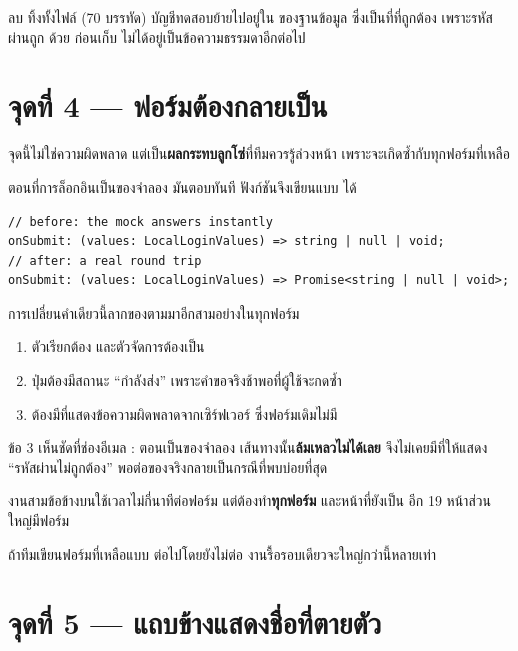  ลบ  ทิ้งทั้งไฟล์ (70 บรรทัด) บัญชีทดสอบย้ายไปอยู่ใน
 ของฐานข้อมูล ซึ่งเป็นที่ที่ถูกต้อง เพราะรหัสผ่านถูก 
ด้วย  ก่อนเก็บ ไม่ได้อยู่เป็นข้อความธรรมดาอีกต่อไป

\section{จุดที่ 4 --- ฟอร์มต้องกลายเป็น }

จุดนี้ไม่ใช่ความผิดพลาด แต่เป็น\textbf{ผลกระทบลูกโซ่}ที่ทีมควรรู้ล่วงหน้า
เพราะจะเกิดซ้ำกับทุกฟอร์มที่เหลือ

ตอนที่การล็อกอินเป็นของจำลอง มันตอบทันที ฟังก์ชันจึงเขียนแบบ  ได้

\begin{lstlisting}
// before: the mock answers instantly
onSubmit: (values: LocalLoginValues) => string | null | void;
// after: a real round trip
onSubmit: (values: LocalLoginValues) => Promise<string | null | void>;
\end{lstlisting}

การเปลี่ยนคำเดียวนี้ลากของตามมาอีกสามอย่างในทุกฟอร์ม

\begin{enumerate}
  \item ตัวเรียกต้อง  และตัวจัดการต้องเป็น 
  \item ปุ่มต้องมีสถานะ ``กำลังส่ง'' เพราะคำขอจริงช้าพอที่ผู้ใช้จะกดซ้ำ
  \item ต้องมีที่แสดงข้อความผิดพลาดจากเซิร์ฟเวอร์ ซึ่งฟอร์มเดิมไม่มี
\end{enumerate}

ข้อ 3 เห็นชัดที่ช่องอีเมล : ตอนเป็นของจำลอง เส้นทางนั้น\textbf{ล้มเหลวไม่ได้เลย}
จึงไม่เคยมีที่ให้แสดง ``รหัสผ่านไม่ถูกต้อง'' พอต่อของจริงกลายเป็นกรณีที่พบบ่อยที่สุด

\begin{warnbox}[title={คูณด้วยจำนวนฟอร์มที่ยังไม่ได้ทำ}]
งานสามข้อข้างบนใช้เวลาไม่กี่นาทีต่อฟอร์ม แต่ต้องทำ\textbf{ทุกฟอร์ม}
และหน้าที่ยังเป็น  อีก 19 หน้าส่วนใหญ่มีฟอร์ม

ถ้าทีมเขียนฟอร์มที่เหลือแบบ  ต่อไปโดยยังไม่ต่อ 
งานรื้อรอบเดียวจะใหญ่กว่านี้หลายเท่า
\end{warnbox}

\section{จุดที่ 5 --- แถบข้างแสดงชื่อที่ตายตัว}

